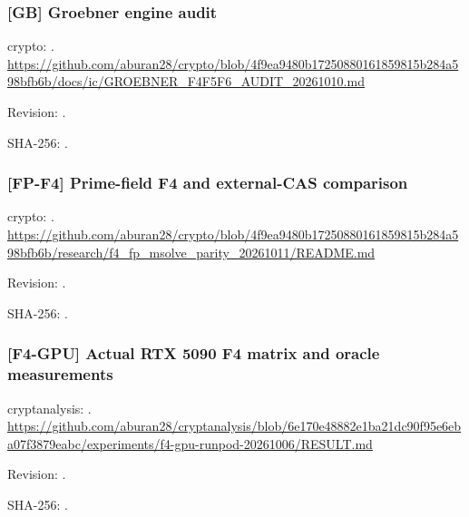 \par\noindent\begin{minipage}{\linewidth}\small
\subsubsection*{[GB] Groebner engine audit}\label{art:GB}
crypto: .
\url{https://github.com/aburan28/crypto/blob/4f9ea9480b17250880161859815b284a598bfb6b/docs/ic/GROEBNER_F4F5F6_AUDIT_20261010.md}
\par Revision: .
\par SHA-256: .
\end{minipage}\par\medskip

\par\noindent\begin{minipage}{\linewidth}\small
\subsubsection*{[FP-F4] Prime-field F4 and external-CAS comparison}\label{art:FP-F4}
crypto: .
\url{https://github.com/aburan28/crypto/blob/4f9ea9480b17250880161859815b284a598bfb6b/research/f4_fp_msolve_parity_20261011/README.md}
\par Revision: .
\par SHA-256: .
\end{minipage}\par\medskip

\par\noindent\begin{minipage}{\linewidth}\small
\subsubsection*{[F4-GPU] Actual RTX 5090 F4 matrix and oracle measurements}\label{art:F4-GPU}
cryptanalysis: .
\url{https://github.com/aburan28/cryptanalysis/blob/6e170e48882e1ba21dc90f95e6eba07f3879eabc/experiments/f4-gpu-runpod-20261006/RESULT.md}
\par Revision: .
\par SHA-256: .
\end{minipage}\par\medskip

